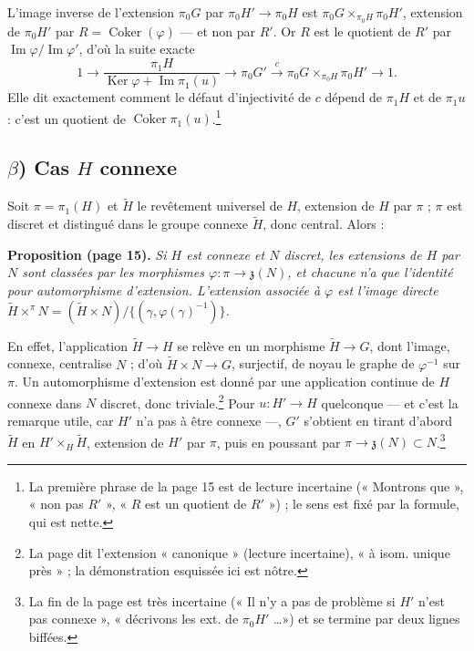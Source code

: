 \documentclass[11pt,a4paper]{article}
\begin{document}
L'image inverse de l'extension $\pi_0 G$ par $\pi_0 H' \to \pi_0 H$ est
$\pi_0 G \times_{\pi_0 H} \pi_0 H'$, extension de $\pi_0 H'$ par $R =
\operatorname{Coker}(\varphi)$ — et non par $R'$. Or $R$ est le quotient de
$R'$ par $\operatorname{Im} \varphi / \operatorname{Im} \varphi'$, d'où la
suite exacte
\[
  1 \longrightarrow \frac{\pi_1 H}{\operatorname{Ker} \varphi +
  \operatorname{Im} \pi_1(u)} \longrightarrow \pi_0 G' \xrightarrow{\ c\ }
  \pi_0 G \times_{\pi_0 H} \pi_0 H' \longrightarrow 1 .
\]
Elle dit exactement comment le défaut d'injectivité de $c$ dépend de
$\pi_1 H$ et de $\pi_1 u$ : c'est un quotient de $\operatorname{Coker}
\pi_1(u)$.\footnote{La première phrase de la page 15 est de lecture
incertaine (« Montrons que », « non pas $R'$ », « $R$ est un quotient de
$R'$ ») ; le sens est fixé par la formule, qui est nette.}

\subsection*{$\beta$) Cas $H$ connexe}

Soit $\pi = \pi_1(H)$ et $\widetilde{H}$ le revêtement universel de $H$,
extension de $H$ par $\pi$ ; $\pi$ est discret et distingué dans le groupe
connexe $\widetilde{H}$, donc central. Alors :

\textbf{Proposition (page 15).} \emph{Si $H$ est connexe et $N$ discret, les
extensions de $H$ par $N$ sont classées par les morphismes $\varphi : \pi \to
\mathfrak{z}(N)$, et chacune n'a que l'identité pour automorphisme
d'extension. L'extension associée à $\varphi$ est l'image directe
$\widetilde{H} \times^{\pi} N = (\widetilde{H} \times N) / \{ (\gamma,
\varphi(\gamma)^{-1}) \}$.}

En effet, l'application $\widetilde{H} \to H$ se relève en un morphisme
$\widetilde{H} \to G$, dont l'image, connexe, centralise $N$ ; d'où
$\widetilde{H} \times N \to G$, surjectif, de noyau le graphe de
$\varphi^{-1}$ sur $\pi$. Un automorphisme d'extension est donné par une
application continue de $H$ connexe dans $N$ discret, donc
triviale.\footnote{La page dit l'extension « canonique » (lecture
incertaine), « à isom. unique près » ; la démonstration esquissée ici est
nôtre.} Pour $u : H' \to H$ quelconque — et c'est la remarque utile, car
$H'$ n'a pas à être connexe —, $G'$ s'obtient en tirant d'abord
$\widetilde{H}$ en $H' \times_H \widetilde{H}$, extension de $H'$ par $\pi$,
puis en poussant par $\pi \to \mathfrak{z}(N) \subset N$.\footnote{La fin de
la page est très incertaine (« Il n'y a pas de problème si $H'$ n'est pas
connexe », « décrivons les ext. de $\pi_0 H'$ \dots ») et se termine par deux
lignes biffées.}
\end{document}
